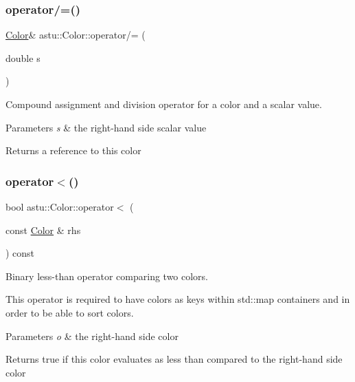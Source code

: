 \subsubsection{\texorpdfstring{operator/=()}{operator/=()}}
{\footnotesize\ttfamily \hyperlink{classastu_1_1Color}{Color}\& astu\+::\+Color\+::operator/= (\begin{DoxyParamCaption}\item[{double}]{s }\end{DoxyParamCaption})}

Compound assignment and division operator for a color and a scalar value.


\begin{DoxyParams}{Parameters}
{\em s} & the right-\/hand side scalar value \\
\hline
\end{DoxyParams}
\begin{DoxyReturn}{Returns}
a reference to this color 
\end{DoxyReturn}
\mbox{\label{classastu_1_1Color_a23c1c73e9815bdbae91de67d54f25cb8}} 
\subsubsection{\texorpdfstring{operator$<$()}{operator<()}}
{\footnotesize\ttfamily bool astu\+::\+Color\+::operator$<$ (\begin{DoxyParamCaption}\item[{const \hyperlink{classastu_1_1Color}{Color} \&}]{rhs }\end{DoxyParamCaption}) const}

Binary less-\/than operator comparing two colors.

This operator is required to have colors as keys within std\+::map containers and in order to be able to \textquotesingle{}sort\textquotesingle{} colors.


\begin{DoxyParams}{Parameters}
{\em o} & the right-\/hand side color \\
\hline
\end{DoxyParams}
\begin{DoxyReturn}{Returns}
{\ttfamily true} if this color evaluates as \textquotesingle{}less than\textquotesingle{} compared to the right-\/hand side color 
\end{DoxyReturn}
\mbox{\label{classastu_1_1Color_aa1b234404e692bd343d026f03c7b9832}} 
